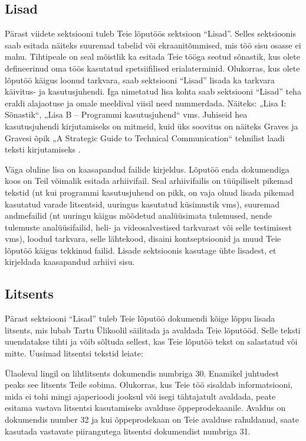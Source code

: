 \subsection{Lisad}
Pärast viidete sektsiooni tuleb Teie lõputöös sektsioon “Lisad”. Selles sektsioonis saab esitada näiteks suuremad tabelid või ekraanitõmmised, mis töö sisu osasse ei mahu. Tihtipeale on seal mõistlik ka esitada Teie tööga seotud sõnastik, kus olete defineerinud oma töös kasutatud spetsiifilised erialaterminid. Olukorras, kus olete lõputöö käigus loonud tarkvara, saab sektsiooni “Lisad” lisada ka tarkvara käivitus- ja kasutusjuhendi. Iga nimetatud lisa kohta saab sektsiooni “Lisad” teha eraldi alajaotuse ja omale meeldival viisil need nummerdada. Näiteks: „Lisa I: Sõnastik“, „Lisa B – Programmi kasutusjuhend“ vms. Juhiseid hea kasutusjuhendi kirjutamiseks on mitmeid, kuid üks soovitus on näiteks Graves ja Gravesi õpik „A Strategic Guide to Technical Communication“ tehnilist laadi teksti kirjutamiseks \cite{graves_strategic_2012}.

Väga oluline lisa on kaasapandud failide kirjeldus. Lõputöö enda dokumendiga koos on Teil võimalik esitada arhiivifail. Seal arhiivifailis on tüüpiliselt pikemad tekstid (nt kui programmi kasutusjuhend on pikk, on vaja olnud lisada pikemad kasutatud varade litsentsid, uuringus kasutatud küsimustik vms), suuremad andmefailid (nt uuringu käigus mõõdetud analüüsimata tulemused, nende tulemuste analüüsifailid, heli- ja videosalvestised tarkvarast või selle testimisest vms), loodud tarkvara, selle lähtekood, disaini kontseptsioonid ja muud Teie lõputöö käigus tekkinud failid. Lisade sektsioonis kasutage ühte lisadest, et kirjeldada kaasapandud arhiivi sisu.

\subsection{Litsents} \label{subchapter:litsents}
Pärast sektsiooni “Lisad” tuleb Teie lõputöö dokumendi kõige lõppu lisada litsents, mis lubab Tartu Ülikoolil säilitada ja avaldada Teie lõputööd. Selle teksti uuendatakse tihti ja võib sõltuda sellest, kas Teie lõputöö tekst on salastatud või mitte. Uusimad litsentsi tekstid leiate: 

Ülaoleval lingil on lihtlitsents dokumendis numbriga 30. Enamikel juhtudest peaks see litsents Teile sobima. Olukorras, kus Teie töö sisaldab informatsiooni, mida ei tohi mingi ajaperioodi jooksul või isegi tähtajatult avaldada, peate esitama vastava litsentsi kasutamiseks avalduse õppeprodekaanile. Avaldus on dokumendis number 32 ja kui õppeprodekaan on Teie avalduse rahuldanud, saate kasutada vastavate piirangutega litsentsi dokumendist numbriga 31.

